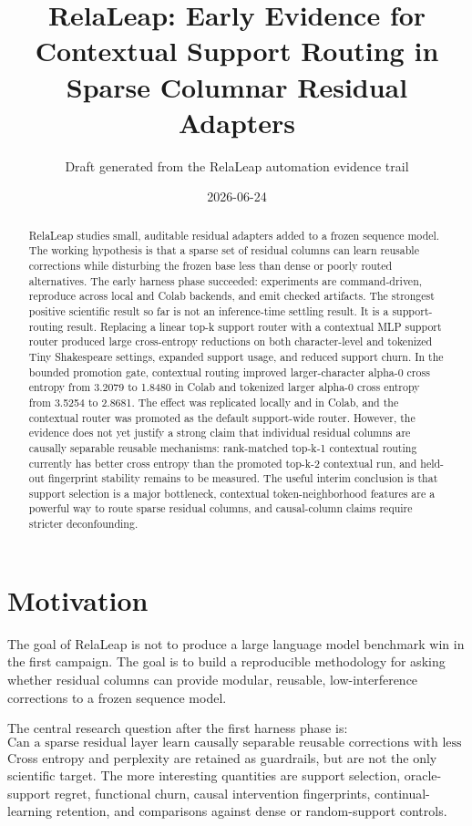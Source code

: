 \documentclass[11pt]{article}
\title{RelaLeap: Early Evidence for Contextual Support Routing in Sparse Columnar Residual Adapters}
\author{Draft generated from the RelaLeap automation evidence trail}
\date{2026-06-24}
\begin{document}
\maketitle

\begin{abstract}
RelaLeap studies small, auditable residual adapters added to a frozen
sequence model. The working hypothesis is that a sparse set of residual
columns can learn reusable corrections while disturbing the frozen base less
than dense or poorly routed alternatives. The early harness phase succeeded:
experiments are command-driven, reproduce across local and Colab backends, and
emit checked artifacts. The strongest positive scientific result so far is not
an inference-time settling result. It is a support-routing result. Replacing a
linear top-k support router with a contextual MLP support router produced large
cross-entropy reductions on both character-level and tokenized Tiny
Shakespeare settings, expanded support usage, and reduced support churn. In
the bounded promotion gate, contextual routing improved larger-character
alpha-0 cross entropy from 3.2079 to 1.8480 in Colab and tokenized larger
alpha-0 cross entropy from 3.5254 to 2.8681. The effect was replicated locally
and in Colab, and the contextual router was promoted as the default
support-wide router. However, the evidence does not yet justify a strong claim
that individual residual columns are causally separable reusable mechanisms:
rank-matched top-k-1 contextual routing currently has better cross entropy than
the promoted top-k-2 contextual run, and held-out fingerprint stability remains
to be measured. The useful interim conclusion is that support selection is a
major bottleneck, contextual token-neighborhood features are a powerful way to
route sparse residual columns, and causal-column claims require stricter
deconfounding.
\end{abstract}

\section{Motivation}

The goal of RelaLeap is not to produce a large language model benchmark win in
the first campaign. The goal is to build a reproducible methodology for asking
whether residual columns can provide modular, reusable, low-interference
corrections to a frozen sequence model.

The central research question after the first harness phase is:
\[
\text{Can a sparse residual layer learn causally separable reusable
corrections with less interference than matched alternatives?}
\]
Cross entropy and perplexity are retained as guardrails, but are not the only
scientific target. The more interesting quantities are support selection,
oracle-support regret, functional churn, causal intervention fingerprints,
continual-learning retention, and comparisons against dense or random-support
controls.
\end{document}
